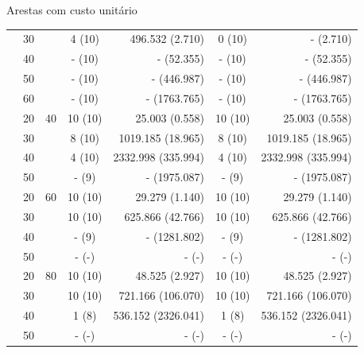 \documentclass[dvipsnames]{beamer}
\begin{document}
\begin{frame}{Arestas com custo unitário}
{\begin{table}
\begin{tabular}{|c|c|c|c|r|c|r|}
 & 30 & & 4 (10) & 496.532 (2.710) & 0 (10) & - (2.710) \\ 
 & 40 & & - (10) & - (52.355) & - (10) & - (52.355) \\ 
 & 50 & & - (10) & - (446.987) & - (10) & - (446.987) \\ 
 & 60 & & - (10) & - (1763.765) & - (10) & - (1763.765) \\ 
 & 20 & 40 & 10 (10) & 25.003 (0.558) & 10 (10) & 25.003 (0.558) \\ 
 & 30 & & 8 (10) & 1019.185 (18.965) & 8 (10) & 1019.185 (18.965) \\ 
 & 40 & & 4 (10) & 2332.998 (335.994) & 4 (10) & 2332.998 (335.994) \\ 
 & 50 & & - (9) & - (1975.087) & - (9) & - (1975.087) \\ 
 & 20 & 60 & 10 (10) & 29.279 (1.140) & 10 (10) & 29.279 (1.140) \\ 
 & 30 & & 10 (10) & 625.866 (42.766) & 10 (10) & 625.866 (42.766) \\ 
 & 40 & & - (9) & - (1281.802) & - (9) & - (1281.802) \\ 
 & 50 & & - (-) & - (-) & - (-) & - (-) \\ 
 & 20 & 80 & 10 (10) & 48.525 (2.927) & 10 (10) & 48.525 (2.927) \\ 
 & 30 & & 10 (10) & 721.166 (106.070) & 10 (10) & 721.166 (106.070) \\ 
 & 40 & & 1 (8) & 536.152 (2326.041) & 1 (8) & 536.152 (2326.041) \\ 
 & 50 & & - (-) & - (-) & - (-) & - (-) \\ 


\hline\hline
\end{tabular}
\end{table}
}
  
\end{frame}
\end{document}
